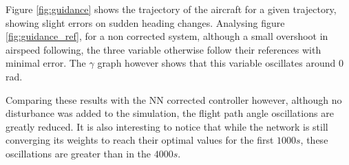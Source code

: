 Figure \ref{fig:guidance} shows the trajectory of the aircraft for a given trajectory, showing slight errors on sudden heading changes. Analysing figure \ref{fig:guidance_ref}, for a non corrected system, although a small overshoot in airspeed following, the three variable otherwise follow their references with minimal error. The $\gamma$ graph however shows that this variable oscillates around $0$ rad.

Comparing these results with the NN corrected controller however, although no disturbance was added to the simulation, the flight path angle oscillations are greatly reduced. It is also interesting to notice that while the network is still converging its weights to reach their optimal values for the first $1000s$, these oscillations are greater than in the $4000s$.